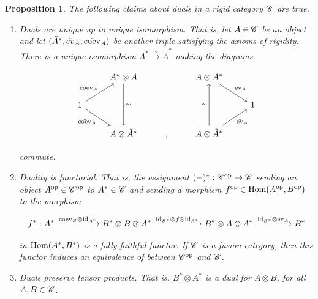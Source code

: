 \documentclass{article}
\newtheorem{proposition}{Proposition}[section]
\theoremstyle{definition}
\numberwithin{figure}{section}
\begin{document}
\begin{proposition}\label{rigidity} The following claims about duals in a rigid category $\mathscr{C}$ are true.

\begin{enumerate}
\item Duals are unique up to unique isomorphism. That is, let $A\in \mathscr{C}$ be an object and let $(\tilde{A}^{*},\tilde{ev}_A,\tilde{\mathrm{coev}}_A)$ be another triple satisfying the axioms of rigidity. There is a unique isomorphism $A^{*}\xrightarrow{\sim}\tilde{A}^{*}$ making the diagrams

\[\begin{tikzcd}
	& {A^{*}\otimes A} && {A\otimes A^{*}} \\
	1 &&&& 1 \\
	& {A\otimes \tilde{A}^*} & {,} & {A\otimes \tilde{A}^{*}}
	\arrow["{\coev_A}", from=2-1, to=1-2]
	\arrow["{\tilde{\coev}_A}"', from=2-1, to=3-2]
	\arrow["\sim", from=1-2, to=3-2]
	\arrow["\sim", from=3-4, to=1-4]
	\arrow["{\ev_A}", from=1-4, to=2-5]
	\arrow["{\tilde{\ev}_A}"', from=3-4, to=2-5]
\end{tikzcd}\]

commute.

\item Duality is functorial. That is, the assignment $(\--)^{*}:\mathscr{C}^{\mathrm{op}}\to \mathscr{C}$ sending an object $A^{\mathrm{op}}\in \mathscr{C}^{\mathrm{op}}$ to $A^{*}\in \mathscr{C}$ and sending a morphism $f^{\mathrm{op}}\in \mathrm{Hom}(A^{\mathrm{op}},B^{\mathrm{op}})$ to the morphism

$$f^*:A^*\xrightarrow{\mathrm{coev}_B\otimes \mathrm{id}_{A^*}} B^*\otimes B\otimes A^*\xrightarrow{\mathrm{id}_{B^*}\otimes f\otimes \mathrm{id}_{A^*}} B^*\otimes A\otimes A^* \xrightarrow{\mathrm{id}_{B^*}\otimes \mathrm{ev}_A} B^*$$

in $\mathrm{Hom}(A^{*},B^{*})$ is a fully faithful functor. If $\mathscr{C}$ is a fusion category, then this functor induces an equivalence of between $\mathscr{C}^{\mathrm{op}}$ and $\mathscr{C}$.

\item Duals preserve tensor products. That is, $B^{*}\otimes A^*$ is a dual for $A\otimes B$, for all $A,B\in \mathscr{C}$.
\end{enumerate}
\end{proposition}
\end{document}
